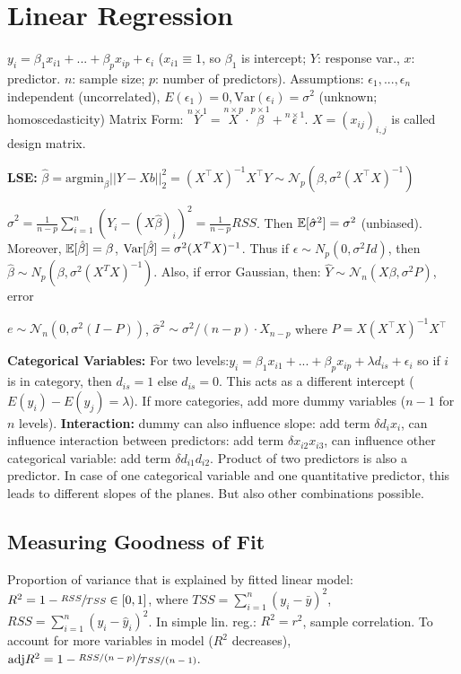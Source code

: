 \section*{Linear Regression}
$y_i = \beta_1 x_{i1}+...+\beta_p x_{ip} + \epsilon_i$ ($x_{i1}\equiv 1$, so $\beta_1$ is intercept; $Y$: response var., $x$: predictor. $n$: sample size; $p$: number of predictors).
Assumptions: $\epsilon_1,...,\epsilon_n$ independent (uncorrelated), $E(\epsilon_1)=0, \text{Var} (\epsilon_i)=\sigma^2$ (unknown; homoscedasticity)
Matrix Form: $\stackrel{n\times 1}{Y}= \stackrel{n\times p}{X} \cdot \stackrel{p\times 1}{\beta} + \stackrel{n\times 1}{\epsilon}$. $X=(x_{ij})_{i,j}$ is called design matrix.

\textbf{LSE:} $\hat \beta = \text{argmin}_\beta ||Y-Xb||_2^2 = (X^\top X)^{-1}X^\top Y \sim \mathcal{N}_p(\beta, \sigma^2 (X^\top X)^{-1})$

$\hat \sigma ^2=\tfrac{1}{n-p}\sum_{i=1}^n(Y_i-(X\hat\beta)_i)^2= \tfrac{1}{n-p} RSS$.
Then $\mathbb{E}[\hat\sigma^2]=\sigma^2$ (unbiased).
Moreover, $\mathbb{E}[\hat\beta]=\beta$, $\textup{Var}[\hat\beta]= \sigma^2(X^TX)^{-1}$.
Thus if $\epsilon \sim N_p(0, \sigma^2 Id)$, then $\hat\beta \sim N_p(\beta, \sigma^2(X^TX)^{-1})$.
Also, if error Gaussian, then: $\hat Y \sim \mathcal{N}_n(X\beta, \sigma^2 P)$, error

$e \sim \mathcal{N}_n(0, \sigma^2(I-P))$,
$\hat \sigma^2 \sim {\sigma^2 }/{(n-p)}\cdot X_{n-p}$
where $P=X(X^\top X)^{-1}X^\top $

\textbf{Categorical Variables:}
For two levels:$y_i = \beta_1 x_{i1}+...+\beta_p x_{ip} + \lambda d_{is} + \epsilon_i$
so if $i$ is in category, then $d_{is}=1$ else $d_{is}=0$. This acts as a different intercept ($E(y_i)-E(y_j)=\lambda$).
If more categories, add more dummy variables ($n-1$ for $n$ levels).
% 
\textbf{Interaction:} dummy can also influence slope:
add term $\delta d_i x_i$, can influence interaction between predictors:
add term $\delta x_{i2} x_{i3}$, can influence other categorical variable:
add term $\delta d_{i1}d_{i2}$.
Product of two predictors is also a predictor.
In case of one categorical variable and one quantitative predictor, this leads to different slopes of the planes.
But also other combinations possible.

\subsection*{Measuring Goodness of Fit}
Proportion of variance that is explained by fitted linear model: $R^2=1-\sfrac{RSS}{TSS}\in [0,1]$,
where $TSS= \sum_{i=1}^n(y_i-\bar y)^2$, $RSS= \sum_{i=1}^n(y_i-\hat y_i)^2$. 
In simple lin. reg.: $R^2=r^2$, sample correlation.
To account for more variables in model ($R^2$ decreases), $\textup{adj}R^2 = 1 - \sfrac{RSS/(n-p)}{TSS/(n-1)}$.

